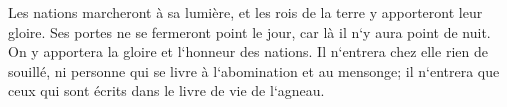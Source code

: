 \verse Les nations marcheront à sa lumière, et les rois de la terre y apporteront leur gloire. 
\verse Ses portes ne se fermeront point le jour, car là il n`y aura point de nuit. 
\verse On y apportera la gloire et l`honneur des nations. 
\verse Il n`entrera chez elle rien de souillé, ni personne qui se livre à l`abomination et au mensonge; il n`entrera que ceux qui sont écrits dans le livre de vie de l`agneau. 

\chapter{}

